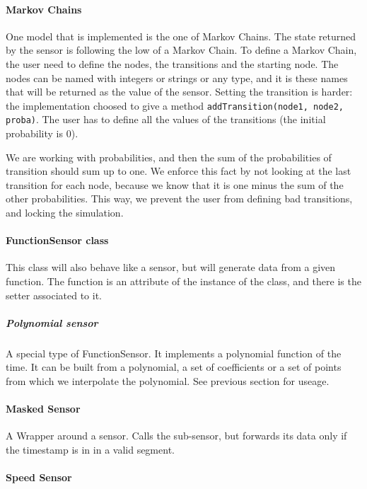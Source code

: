 \paragraph{Markov Chains}

One model that is implemented is the one of Markov Chains. The state returned
by the sensor is following the low of a Markov Chain. To define a Markov
Chain, the user need to define the nodes, the transitions and the starting
node. The nodes can be named with integers or strings or any type, and it is these names that will be returned as the value of the sensor.
Setting the transition is harder: the implementation choosed to give a method
\verb!addTransition(node1, node2, proba)!. The user has to define all the
values of the transitions (the initial probability is 0).

We are working with probabilities, and then the sum of the probabilities of transition should sum up to one.
We enforce this fact by not looking at the last transition for each node, because we know that it is one minus the sum of the other probabilities. This way, we prevent the user from defining bad transitions, and locking the simulation.

\paragraph{FunctionSensor class}

This class will also behave like a sensor, but will generate data from a given
function. The function is an attribute of the instance of the class, and there
is the setter associated to it.

\subparagraph{Polynomial sensor}

A special type of FunctionSensor. It implements a polynomial function of
the time. It can be built from a polynomial, a set of coefficients or a set
of points from which we interpolate the polynomial. See previous section for
useage.

\paragraph{Masked Sensor}

A Wrapper around a sensor. Calls the sub-sensor, but forwards its data only if
the timestamp is in in a valid segment.

\paragraph{Speed Sensor}

